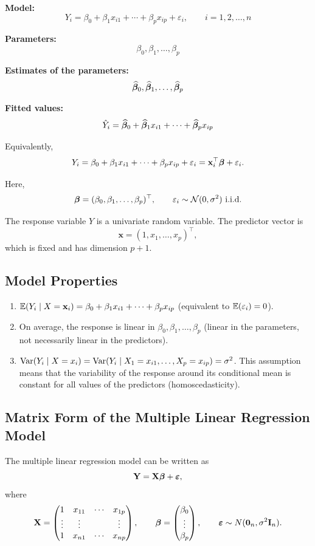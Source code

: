 \textbf{Model:}
\[
Y_i = \beta_0 + \beta_1 x_{i1} + \cdots + \beta_p x_{ip} + \varepsilon_i,
\qquad i = 1, 2, \ldots, n
\]

\textbf{Parameters:}
\[
\beta_0, \beta_1, \ldots, \beta_p
\]

\textbf{Estimates of the parameters:}
\[
\widehat{\boldsymbol{\beta}}_0, \widehat{\boldsymbol{\beta}}_1, \ldots, \widehat{\boldsymbol{\beta}}_p
\]

\textbf{Fitted values:}
\[
\hat{Y}_i = \widehat{\boldsymbol{\beta}}_0 + \widehat{\boldsymbol{\beta}}_1 x_{i1} + \cdots + \widehat{\boldsymbol{\beta}}_p x_{ip}
\]

Equivalently,
\[
Y_i = \beta_0 + \beta_1 x_{i1} + \cdots + \beta_p x_{ip} + \varepsilon_i
= \mathbf{x}_i^\top \boldsymbol{\beta} + \varepsilon_i.
\]

Here,
\[
\boldsymbol{\beta} = (\beta_0,\beta_1,\dots,\beta_p)^\top,
\qquad
\varepsilon_i \sim \mathcal{N}(0,\sigma^2) \text{ i.i.d.}
\]

The response variable $Y$ is a univariate random variable. The predictor vector is
\[
\mathbf{x} = (1, x_1, \dots, x_p)^\top,
\]
which is fixed and has dimension $p+1$.

\subsection{Model Properties}

\begin{enumerate}
    \item $\mathbb{E}(Y_i \mid X = \mathbf{x}_i) = \beta_0 + \beta_1 x_{i1} + \cdots + \beta_p x_{ip}$ (equivalent to $\mathbb{E}(\varepsilon_i) = 0$).

    \item On average, the response is linear in $\beta_0,\beta_1,\dots,\beta_p$ (linear in the parameters, not necessarily linear in the predictors).

    \item $\operatorname{Var}(Y_i \mid X = x_i) = \operatorname{Var}(Y_i \mid X_1 = x_{i1}, \ldots, X_p = x_{ip}) = \sigma^2$. This assumption means that the variability of the response around its conditional mean is constant for all values of the predictors (homoscedasticity).
\end{enumerate}

\subsection{Matrix Form of the Multiple Linear Regression Model}

The multiple linear regression model can be written as
\[
\mathbf{Y} = \mathbf{X}\boldsymbol{\beta} + \boldsymbol{\varepsilon},
\]
where
\[
\mathbf{X}
=
\begin{pmatrix}
1 & x_{11} & \cdots & x_{1p} \\
\vdots & \vdots & & \vdots \\
1 & x_{n1} & \cdots & x_{np}
\end{pmatrix},
\qquad
\boldsymbol{\beta}
=
\begin{pmatrix}
\beta_0 \\
\vdots \\
\beta_p
\end{pmatrix},
\qquad
\boldsymbol{\varepsilon}
\sim N(\mathbf{0}_n, \sigma^2 \mathbf{I}_n).
\]

